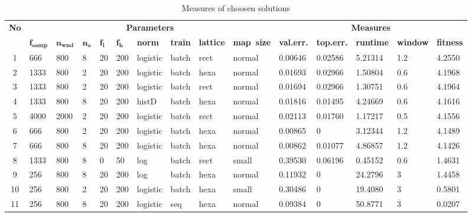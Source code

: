 \documentclass[a4paper]{IEEEtran}
\begin{document}
\begin{table}[!h]
\caption{Measures of choosen solutions}
	\begin{tabular}{|c||p{8mm}|p{8mm}|p{4mm}|p{4mm}|m{5mm} |p{8.5mm}|p{7mm}|p{8mm}|p{11mm} ||p{10mm}|p{10mm}|p{10mm}|p{10mm}|p{10mm}|}
		\hline
			\multirow{2}{*}{\textbf{No}} & 
			\multicolumn{9}{c||}{\textbf{Parameters}} & 
			\multicolumn{5}{c|}{\textbf{Measures}} \\
		\cline{2-15}
			&
			$ \mathbf{f_{samp}} $& 
			$ \mathbf{n_{wnd}} $& 
			$ \mathbf{n_o} $&
			$ \mathbf{f_l} $&
			$ \mathbf{f_h} $& 
			\textbf{norm}&
			\textbf{train}&
			\textbf{lattice} &
			\textbf{map~size} &
			\textbf{val.err.}&
			\textbf{top.err.}&
			\textbf{runtime}&
			\textbf{window}& 
			\textbf{fitness}\\
		\hline\hline
1 & 666 & 800 & 8 & 20 & 200 & logistic & batch & rect & normal & 0.00646 &  0.02586 &  5.21314 &  1.2 & 4.2550 \\ \hline
2 & 1333 & 800 & 2 & 20 & 200 & logistic & batch & hexa & normal &  0.01693 &  0.02966 &  1.50804 &  0.6 & 4.1968 \\ \hline
3 & 1333 & 800 & 2 & 20 & 200 & logistic & batch & rect & normal &  0.01694 &  0.02966 &  1.30751 &  0.6 & 4.1964 \\ \hline
4 & 1333 & 800 & 8 & 20 & 200 & histD & batch & hexa & normal &  0.01816 &  0.01495 &  4.24669 &  0.6 & 4.1616 \\ \hline
5 & 4000 & 2000 & 2 & 20 & 200 & logistic & batch & rect & normal &  0.02113 & 0.01760 &  1.17217 &  0.5 & 4.1556 \\ \hline
6 & 666 & 800 & 2 & 20 & 200 & logistic & batch & hexa & normal &  0.00865 &   0 &  3.12344 &  1.2 &   4.1489 \\ \hline
7 & 666 & 800 & 8 & 20 & 200 & logistic & batch & hexa & normal &  0.00862 &  0.01077 &  4.86857 &  1.2 &  4.1426 \\ \hline
8 & 1333 & 800 & 8 &  0 & 50 & log & batch & rect & small  &  0.39530 &  0.06196 &  0.45152 &  0.6 &   1.4631 \\ \hline
9 & 256 & 800 & 8 & 20 & 200 & log & batch & hexa & normal &   0.11932 &    0 &  24.2796 &    3 &   1.4458 \\ \hline
10 & 256 & 800 & 2 & 20 & 200 & logistic & batch & hexa & small &   0.30486 &    0 &   19.4080 &    3 &  0.5801 \\ \hline
11 & 256 & 800 & 8 & 20 & 200 & logistic & seq & hexa & normal  &  0.09384 &   0 &  50.8771 &    3 & 0.0207 \\ \hline
	\end{tabular}
	\label{tbl:somresults}
\end{table}
\end{document}
